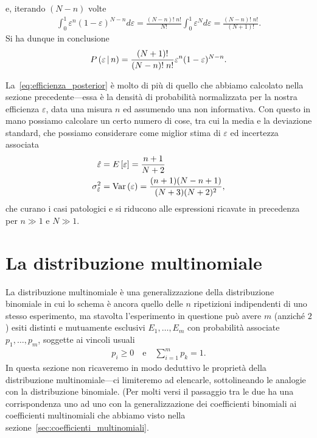 e, iterando $(N - n)$ volte
\begin{align*}
  \int_0^1 \varepsilon^n (1 - \varepsilon)^{N-n} d\varepsilon =
  \frac{(N-n)!\;n!}{N!} \int_0^1 \varepsilon^N  d\varepsilon =
  \frac{(N-n)!\;n!}{(N+1)!}.
\end{align*}
Si ha dunque in conclusione
\begin{align}\label{eq:efficienza_posterior}
  \displaystyle P\left(\varepsilon \,|\, n\right) =
  \frac{(N + 1)!}{(N - n)!\;n!}\varepsilon^n (1 - \varepsilon)^{N-n}.
\end{align}

La~\eqref{eq:efficienza_posterior} è molto di più di quello che abbiamo
calcolato nella sezione precedente---essa è la densità di probabilità
normalizzata per la nostra efficienza $\varepsilon$, data una misura $n$ ed
assumendo una  non informativa. Con questo in mano possiamo
calcolare un certo numero di cose, tra cui la media e la deviazione standard,
che possiamo considerare come miglior stima di $\varepsilon$ ed incertezza
associata
\begin{align}
  \hat\varepsilon & = \displaystyle E\left[\varepsilon\right] = \frac{n + 1}{N + 2}\\
  \sigma^2_{\hat\varepsilon} & = \text{Var}\left(\varepsilon\right) =
  \frac{(n + 1)(N - n + 1)}{(N + 3)(N + 2)^2},
\end{align}
che curano i casi patologici e si riducono alle espressioni ricavate in
precedenza per $n \gg 1$ e $N \gg 1$.


\section{La distribuzione multinomiale}%
\label{sec:distribuzione_multinomiale}

\danger%
La distribuzione multinomiale è una generalizzazione della distribuzione
binomiale in cui lo schema è ancora quello delle $n$ ripetizioni indipendenti
di uno stesso esperimento, ma stavolta l'esperimento in questione può avere
$m$ (anziché $2$) esiti distinti e mutuamente esclusivi $E_1,\ldots,E_m$ con
probabilità associate $p_1, \ldots, p_m$, soggette ai vincoli usuali
\begin{align}
  p_i \geq 0 \quad \text{e} \quad \sum_{i = 1}^m p_k = 1.
\end{align}
In questa sezione non ricaveremo in modo deduttivo le proprietà della
distribuzione multinomiale---ci limiteremo ad elencarle, sottolineando
le analogie con la distribuzione binomiale. (Per molti versi il passaggio tra
le due ha una corrispondenza uno ad uno con la generalizzazione dei coefficienti
binomiali ai coefficienti multinomiali che abbiamo visto nella
sezione~\ref{sec:coefficienti_multinomiali}.

